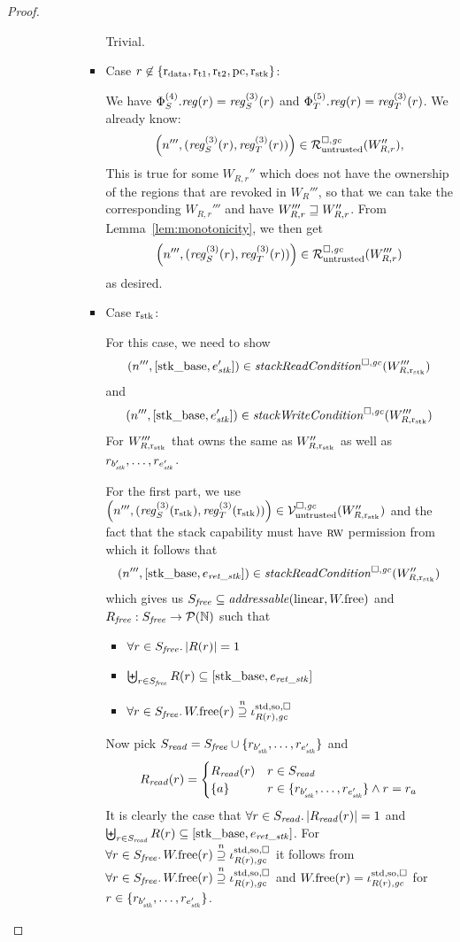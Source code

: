 \begin{proof}
\begin{description}
\begin{itemize}
\begin{itemize}
\begin{itemize}
          Trivial.
        \item Case $r \not\in \{\mathrm{r}_\mathrm{data},\mathrm{r}_\mathrm{t1},\mathrm{r}_\mathrm{t2},\mathrm{pc},\mathrm{r}_\mathrm{stk}\}$:

          We have $\Phi^{(4)}_S.\reg(r) = \reg^{(3)}_S(r)$ and $\Phi^{(5)}_T.\reg(r) = \reg^{(3)}_T(r)$.
          We already know:
          \[\npair[n''']{(\reg^{(3)}_S(r),\reg^{(3)}_T(r))} \in \lrr(W''_{R,r}),\]
          This is true for some $W_{R,r}''$ which does not have the ownership of the regions that are revoked in $W_R'''$, so that we can take the corresponding $W_{R,r}'''$ and have $W_{R,r}''' \sqsupseteq W_{R,r}''$.
          From Lemma~\ref{lem:monotonicity}, we then get
          \[
            \npair[n''']{(\reg^{(3)}_S(r),\reg^{(3)}_T(r))} \in \lrr(W'''_{R,r})
          \]
          as desired.
        \item Case $\mathrm{r}_\mathrm{stk}$:

          For this case, we need to show
          \[
            \npair[n''']{[\stkb,e_\stk']} \in \stackReadCond{W'''_{R,\rstk}}
          \]
          and
          \[
            \npair[n''']{[\stkb,e_\stk']} \in \stackWriteCond{W'''_{R,\rstk}}
          \]
          For $W'''_{R,\mathrm{r}_\mathrm{stk}}$ that owns the same as $W''_{R,\mathrm{r}_\mathrm{stk}}$ as well as $r_{b_{\mathit{stk}}'},\dots,r_{e_{\mathit{stk}}'}$.

          For the first part, we use $\npair[n''']{(\reg_S^{(3)}(\rstk),\reg_T^{(3)}(\rstk))} \in \lrv(W_{R,\rstk}'')$ and the fact that the stack capability must have $\textsc{rw}$ permission from which it follows that
          \[
            \npair[n''']{[\stkb,e_\var{ret\_stk}]} \in \stackReadCond{W''_{R,\rstk}}
          \]
          which gives us $S_\free \subseteq \addressable{\linear,\pwfree}$ and $R_{\mathit{free}} : S_{\mathit{free}} \rightarrow \mathcal{P}(\mathbb{N})$ such that
          \begin{itemize}
          \item $\forall r \in S_{\mathit{free}} \ldotp |R(r)| = 1$
          \item $\biguplus_{r \in S_{\mathit{free}}} R(r) \subseteq [\mathrm{stk\_base},e_{\mathit{ret\_stk}}]$
          \item $\forall r \in S_{\mathit{free}} \ldotp W.\mathrm{free}(r) \overset{n}{\supseteq} \iota^{\mathrm{std},\mathrm{so},\square}_{R(r),\mathit{gc}}$
          \end{itemize}
          Now pick $S_{\mathit{read}} = S_{\mathit{free}} \cup \{r_{b_{\mathit{stk}}'},\dots,r_{e_{\mathit{stk}}'}\}$ and
          \[
            R_{\mathit{read}}(r) =
            \begin{cases}
              R_{\mathit{read}}(r) & r \in S_{\mathit{read}} \\
              \{a\} & r \in \{r_{b_{\mathit{stk}}'},\dots,r_{e_{\mathit{stk}}'}\} \wedge r = r_a
            \end{cases}
          \]
          It is clearly the case that $\forall r \in S_{\mathit{read}} \ldotp |R_{\mathit{read}}(r)| = 1$ and $\biguplus_{r \in S_{\mathit{read}}} R(r) \subseteq [\mathrm{stk\_base},e_{\mathit{ret\_stk}}]$.
          For $\forall r \in S_{\mathit{free}} \ldotp W.\mathrm{free}(r) \overset{n}{\supseteq} \iota^{\mathrm{std},\mathrm{so},\square}_{R(r),\mathit{gc}}$ it follows from $\forall r \in S_{\mathit{free}} \ldotp W.\mathrm{free}(r) \overset{n}{\supseteq} \iota^{\mathrm{std},\mathrm{so},\square}_{R(r),\mathit{gc}}$ and $W.\mathrm{free}(r) = \iota^{\mathrm{std},\mathrm{so},\square}_{R(r),\mathit{gc}}$ for $r \in \{r_{b_{\mathit{stk}}'},\dots,r_{e_{\mathit{stk}}'}\}$.


\end{itemize}
\end{itemize}
\end{itemize}
\end{description}
\end{proof}
